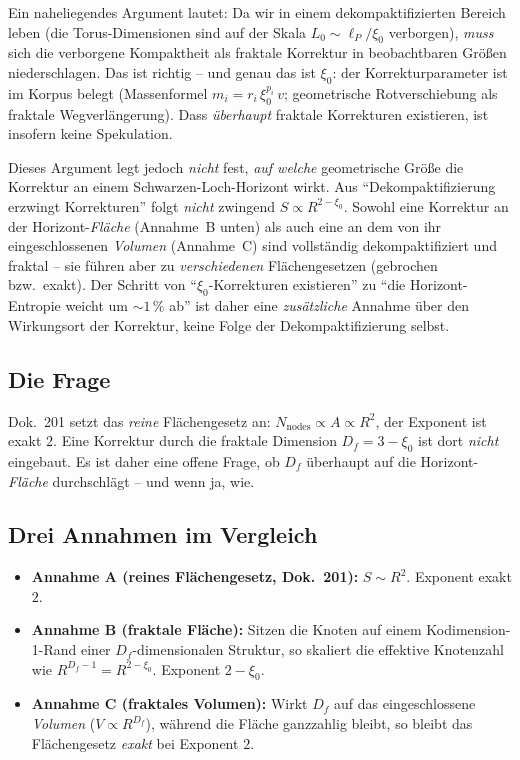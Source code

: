 Ein naheliegendes Argument lautet: Da wir in einem dekompaktifizierten
Bereich leben (die Torus-Dimensionen sind auf der Skala $L_0 \sim
\ell_P/\xi_0$ verborgen), \emph{muss} sich die verborgene Kompaktheit als
fraktale Korrektur in beobachtbaren Größen niederschlagen. Das ist richtig --
und genau das ist $\xi_0$: der Korrekturparameter ist im Korpus belegt
(Massenformel $m_i = r_i\,\xi_0^{p_i}\,v$; geometrische Rotverschiebung als
fraktale Wegverlängerung). Dass \emph{überhaupt} fraktale Korrekturen
existieren, ist insofern keine Spekulation.

\medskip

\noindent
Dieses Argument legt jedoch \emph{nicht} fest, \emph{auf welche} geometrische
Größe die Korrektur an einem Schwarzen-Loch-Horizont wirkt. Aus
\enquote{Dekompaktifizierung erzwingt Korrekturen} folgt \emph{nicht}
zwingend $S \propto R^{2-\xi_0}$. Sowohl eine Korrektur an der
Horizont-\emph{Fläche} (Annahme~B unten) als auch eine an dem von ihr
eingeschlossenen \emph{Volumen} (Annahme~C) sind vollständig dekompaktifiziert
und fraktal -- sie führen aber zu \emph{verschiedenen} Flächengesetzen
(gebrochen bzw.\ exakt). Der Schritt von \enquote{$\xi_0$-Korrekturen
existieren} zu \enquote{die Horizont-Entropie weicht um $\sim 1\,\%$ ab} ist
daher eine \emph{zusätzliche} Annahme über den Wirkungsort der Korrektur,
keine Folge der Dekompaktifizierung selbst.

\subsection*{Die Frage}

Dok.~201 setzt das \emph{reine} Flächengesetz an: $N_{\text{nodes}} \propto A
\propto R^2$, der Exponent ist exakt $2$. Eine Korrektur durch die fraktale
Dimension $D_f = 3 - \xi_0$ ist dort \emph{nicht} eingebaut. Es ist daher
eine offene Frage, ob $D_f$ überhaupt auf die Horizont-\emph{Fläche}
durchschlägt -- und wenn ja, wie.

\subsection*{Drei Annahmen im Vergleich}

\begin{itemize}
  \item \textbf{Annahme A (reines Flächengesetz, Dok.~201):}
        $S \sim R^{2}$. Exponent exakt $2$.
  \item \textbf{Annahme B (fraktale Fläche):} Sitzen die Knoten auf einem
        Kodimension-1-Rand einer $D_f$-dimensionalen Struktur, so skaliert
        die effektive Knotenzahl wie $R^{D_f - 1} = R^{2-\xi_0}$.
        Exponent $2 - \xi_0$.
  \item \textbf{Annahme C (fraktales Volumen):} Wirkt $D_f$ auf das
        eingeschlossene \emph{Volumen} ($V \propto R^{D_f}$), während die
        Fläche ganzzahlig bleibt, so bleibt das Flächengesetz
        \emph{exakt} bei Exponent $2$.
\end{itemize}

